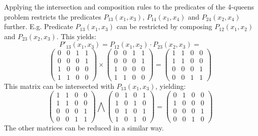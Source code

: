 \documentclass[a4paper,11pt]{article}
\begin{document}
Applying the intersection and composition rules to the predicates of
the 4-queens problem restricts the predicates $P_{13}(x_1, x_3)$,
$P_{14}(x_1, x_4)$ and $P_{24}(x_2, x_4)$ further. E.g. Predicate
$P_{13}(x_1, x_3)$ can be restricted by composing $P_{12}(x_1, x_2)$
and $P_{23}(x_2, x_3)$.
This yields:
\[ P'_{13}(x_1, x_3) = P_{12}(x_1, x_2) \cdot P_{23}(x_2, x_3) = \]
\[ \left(
\begin{array}{cccc}
0 & 0 & 1 & 1 \\
0 & 0 & 0 & 1 \\
1 & 0 & 0 & 0 \\
1 & 1 & 0 & 0
\end{array}
\right)
\times
\left(
\begin{array}{cccc}
0 & 0 & 1 & 1 \\
0 & 0 & 0 & 1 \\
1 & 0 & 0 & 0 \\
1 & 1 & 0 & 0
\end{array}
\right)
=
\left(
\begin{array}{cccc}
1 & 1 & 0 & 0 \\
1 & 1 & 0 & 0 \\
0 & 0 & 0 & 1 \\
0 & 0 & 1 & 1
\end{array}
\right)
\]
This matrix can be intersected with $P_{13}(x_1, x_3)$, yielding:
\[ \left(
\begin{array}{cccc}
1 & 1 & 0 & 0 \\
1 & 1 & 0 & 0 \\
0 & 0 & 0 & 1 \\
0 & 0 & 1 & 1
\end{array}
\right)
\bigwedge
\left(
\begin{array}{cccc}
0 & 1 & 0 & 1 \\
1 & 0 & 1 & 0 \\
0 & 1 & 0 & 1 \\
1 & 0 & 1 & 0
\end{array}
\right)
=
\left(
\begin{array}{cccc}
0 & 1 & 0 & 0 \\
1 & 0 & 0 & 0 \\
0 & 0 & 0 & 1 \\
0 & 0 & 1 & 0
\end{array}
\right)
\]
The other matrices can be reduced in a similar way.
\end{document}
